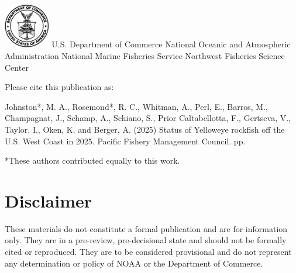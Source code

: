\documentclass[
]{scrartcl}
\renewcommand*\contentsname{Table of contents}
\newcommand\contentsname{Table of contents}
\begin{document}
\begin{titlepage}
\begin{minipage}[b][\textheight][s]{\textwidth}
  \includegraphics[alt={},width=2cm]{support_files/us_doc_logo.png}\newline %
  U.S. Department of Commerce\newline
  National Oceanic and Atmospheric Administration\newline
  National Marine Fisheries Service\newline
  Northwest Fisheries Science Center\newline

  \end{minipage}
  \restoregeometry
  \end{titlepage}

\renewcommand*\contentsname{Table of contents}
{
\hypersetup{linkcolor=}
\setcounter{tocdepth}{3}
\tableofcontents
}
\setcounter{page}{1}

\renewcommand{\thetable}{\roman{table}}
\renewcommand{\thefigure}{\roman{figure}}

\newpage{}

Please cite this publication as:

Johnston*, M. A., Rosemond*, R. C., Whitman, A., Perl, E., Barros, M.,
Champagnat, J., Schamp, A., Schiano, S., Prior Caltabellotta, F.,
Gertseva, V., Taylor, I., Oken, K. and Berger, A. (2025) Status of
Yelloweye rockfish off the U.S. West Coast in 2025. Pacific Fishery
Management Council. \pageref*{LastPage}{} pp.

*These authors contributed equally to this work.

\newpage{}

\setcounter{page}{1}

\renewcommand{\thetable}{\roman{table}}
\renewcommand{\thefigure}{\roman{figure}}

\section*{Disclaimer}\label{disclaimer}

These materials do not constitute a formal publication and are for
information only. They are in a pre-review, pre-decisional state and
should not be formally cited or reproduced. They are to be considered
provisional and do not represent any determination or policy of NOAA or
the Department of Commerce.
\end{document}
